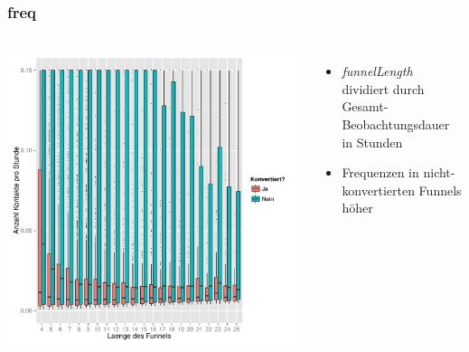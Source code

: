 \begin{frame}\frametitle{freq}
	\begin{columns}
		\column{7cm}
			\includegraphics[scale=0.39]{freq.pdf}
		\column{4cm}
			\begin{itemize}
				\item \textit{funnelLength} dividiert durch Gesamt-Beobachtungsdauer in Stunden
				\item Frequenzen in nicht-konvertierten Funnels höher
			\end{itemize}
	\end{columns}
\end{frame}
